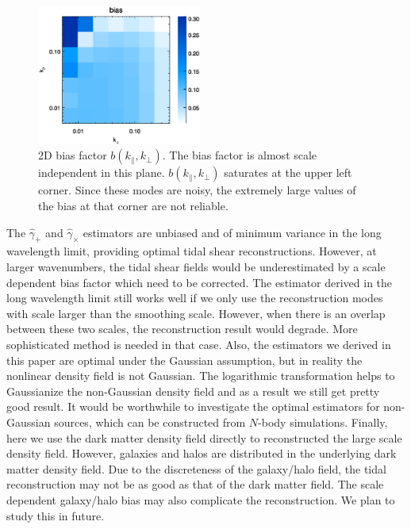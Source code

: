 \documentclass[aps,prd,twocolumn,showpacs,superscriptaddress,groupedaddress,nofootinbib]{revtex4}  %
\begin{document}
\begin{figure}[tbp]
\begin{center}
\includegraphics[width=0.48\textwidth]{f6.eps}
\end{center}
\vspace{-0.7cm}
\caption{\label{fig:bias} 2D bias factor $b(k_\parallel,k_\perp)$. The bias 
factor is almost scale independent in this plane. 
$b(k_\parallel,k_\perp)$ saturates at the upper left corner. Since these
modes are noisy, the extremely large values of the bias at that corner are 
not reliable.}
\end{figure}

The $\hat{\gamma}_+$ and $\hat{\gamma}_\times$ estimators are unbiased
and of minimum variance in the long wavelength limit, providing optimal tidal
shear reconstructions. However, at larger wavenumbers, the tidal shear fields would be underestimated
by a scale dependent bias factor which need to be corrected.
The estimator derived in the long wavelength limit 
still works well if we only use the reconstruction modes with scale larger than 
the smoothing scale. However, when there is an overlap between these two scales, the reconstruction 
result would degrade. More sophisticated method is needed in that case.  Also, 
the estimators we derived in this paper are optimal under the Gaussian assumption, but in reality
the nonlinear density field is not  Gaussian. The logarithmic transformation helps to  Gaussianize the non-Gaussian
density field and as a result we still get pretty good result. It would be worthwhile to investigate the 
 optimal estimators for non-Gaussian sources, which can be constructed from $N$-body
simulations.  Finally,  here we use the dark matter density field directly to reconstructed the large scale 
density field. However, galaxies and halos are distributed in the 
underlying dark matter density field. Due to the discreteness of the 
galaxy/halo field, the tidal reconstruction
may not be as good as that of the dark matter field. The scale dependent 
galaxy/halo bias may also complicate the reconstruction. We plan to study this in future.
\end{document}

